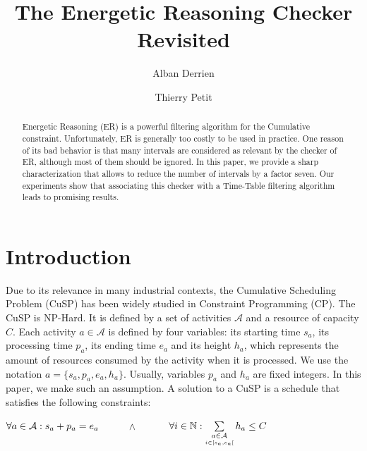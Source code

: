 \documentclass{llncs}
\begin{document}


\title{The Energetic Reasoning Checker Revisited}

\author{Alban Derrien \and Thierry Petit
}

\maketitle
\sloppy 

\begin{abstract} 
Energetic Reasoning  (ER) is a powerful filtering algorithm for the Cumulative constraint. Unfortunately, ER is generally too costly to be used in practice. 
One reason of its bad behavior is that many intervals are considered as relevant by the checker of ER, although most of them should be ignored. In this paper, we provide a sharp characterization that 
allows to reduce the number of intervals by a factor seven. Our experiments show that associating this checker with a Time-Table 
filtering algorithm leads to promising results. 
\end{abstract}

\section{Introduction}
Due to its relevance in many industrial contexts, the Cumulative Scheduling Problem (CuSP) has been widely studied in Constraint Programming (CP). 
The CuSP is NP-Hard. It is defined by a set of activities $\mathcal{A}$ and a resource of capacity $C$. 
Each activity $a \in \mathcal{A}$ is defined by four variables: its starting time $s_a$, its processing time $p_a$, its ending time $e_a$ and its height $h_a$, which represents the amount of resources consumed by the activity 
when it is processed. We use the notation $a = \{ s_a, p_a, e_a, h_a  \}$. 
Usually, variables $p_a$ and $h_a$ are fixed integers. In this paper, we make such an assumption. A solution to a CuSP is a schedule that satisfies the following constraints: 
\begin{center}
$\forall a \in \mathcal{A}: s_a + p_a = e_a \notag$~~~~~~$\wedge$~~~~~~
$\forall i \in \mathbb{N}: \sum \limits_{  \underset{i \in [s_a, e_a[}{a \in \mathcal{A}} } h_a \leq C \notag$ \end{center}
\end{document}
